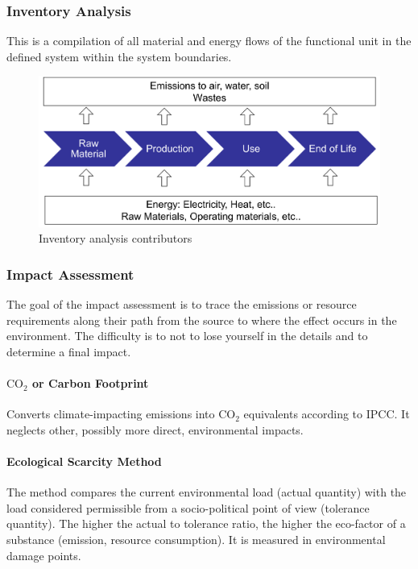 \documentclass[11pt]{article}
\theoremstyle{definition}
\begin{document}
\subsubsection{Inventory Analysis}
This is a compilation of all material and energy flows of the functional unit in the defined system within the system boundaries.
\begin{figure}[H]
	\centering
	\includegraphics[width=0.8\linewidth]{img/inventory_analysis}
	\caption{Inventory analysis contributors}
	\label{fig:inventoryanalysis}
\end{figure}

\subsubsection{Impact Assessment}
The goal of the impact assessment is to trace the emissions or resource requirements along their path from the source to where the effect occurs in the environment. The difficulty is to not to lose yourself in the details and to determine a final impact.

\paragraph{$\text{CO}_2$ or Carbon Footprint} Converts climate-impacting emissions into $\text{CO}_2$ equivalents according to IPCC. It neglects other, possibly more direct, environmental impacts.

\paragraph{Ecological Scarcity Method} The method compares the current environmental load (actual quantity) with the load considered permissible from a socio-political point of view (tolerance quantity). The higher the actual to tolerance ratio, the higher the eco-factor of a substance (emission, resource consumption). It is measured in environmental damage points.
\end{document}
